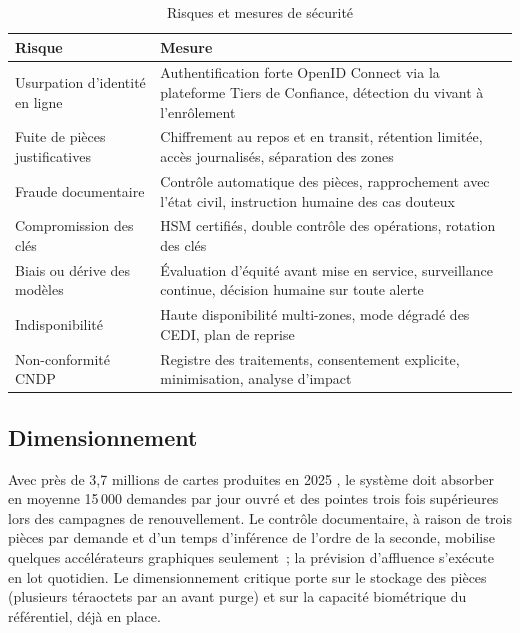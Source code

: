 \begin{table}[h]
\caption{Risques et mesures de sécurité}
\label{tab:secu}
\centering
\small
\begin{tabularx}{\columnwidth}{lX}
\toprule
\textbf{Risque} & \textbf{Mesure} \\
\midrule
Usurpation d'identité en ligne & Authentification forte OpenID Connect via la plateforme Tiers de Confiance, détection du vivant à l'enrôlement \\
Fuite de pièces justificatives & Chiffrement au repos et en transit, rétention limitée, accès journalisés, séparation des zones \\
Fraude documentaire & Contrôle automatique des pièces, rapprochement avec l'état civil, instruction humaine des cas douteux \\
Compromission des clés & HSM certifiés, double contrôle des opérations, rotation des clés \\
Biais ou dérive des modèles & Évaluation d'équité avant mise en service, surveillance continue, décision humaine sur toute alerte \\
Indisponibilité & Haute disponibilité multi-zones, mode dégradé des CEDI, plan de reprise \\
Non-conformité CNDP & Registre des traitements, consentement explicite, minimisation, analyse d'impact \\
\bottomrule
\end{tabularx}
\end{table}

\subsection{Dimensionnement}
Avec près de 3,7 millions de cartes produites en 2025 \cite{lavieeco2025bilan}, le système doit absorber en moyenne 15\,000 demandes par jour ouvré et des pointes trois fois supérieures lors des campagnes de renouvellement. Le contrôle documentaire, à raison de trois pièces par demande et d'un temps d'inférence de l'ordre de la seconde, mobilise quelques accélérateurs graphiques seulement~; la prévision d'affluence s'exécute en lot quotidien. Le dimensionnement critique porte sur le stockage des pièces (plusieurs téraoctets par an avant purge) et sur la capacité biométrique du référentiel, déjà en place.
